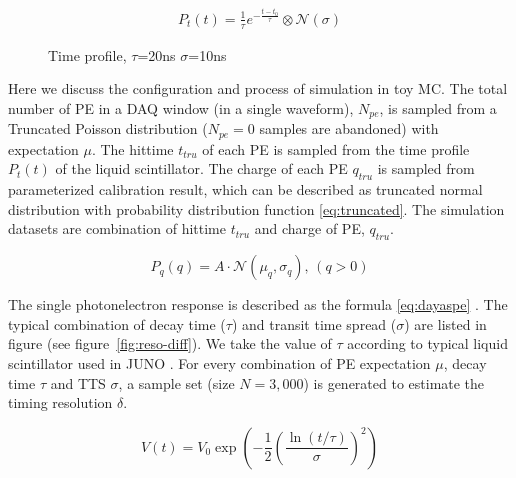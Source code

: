 \begin{minipage}{.4\textwidth}
\begin{align}
    P_{t}(t) = \frac{1}{\tau}e^{-\frac{t - t_{0}}{\tau}} \otimes \mathcal{N}(\sigma)
    \label{eq:time-pro}
\end{align}
\end{minipage}
\begin{minipage}{.6\textwidth}
\begin{figure}[H]
    \centering
    \resizebox{\textwidth}{!}{}
    \caption{\label{fig:time-pro} Time profile, $\tau$=20ns $\sigma$=10ns}
\end{figure}
\end{minipage}

Here we discuss the configuration and process of simulation in toy MC. The total number of PE in a DAQ window (in a single waveform), $N_{pe}$, is sampled from a Truncated Poisson distribution ($N_{pe}=0$ samples are abandoned) with expectation $\mu$. The hittime $t_{tru}$ of each PE is sampled from the time profile $P_{t}(t)$ of the liquid scintillator. The charge of each PE $q_{tru}$ is sampled from parameterized calibration result, which can be described as truncated normal distribution with probability distribution function \eqref{eq:truncated}. The simulation datasets are combination of hittime $t_{tru}$ and charge of PE, $q_{tru}$. 

\begin{equation}
    P_{q}(q) = A\cdot\mathcal{N}(\mu_{q},\sigma_{q}),\,(q>0)
    \label{eq:truncated}
\end{equation}

The single photonelectron response is described as the formula \eqref{eq:dayaspe} \cite{jetter_pmt_2012}. The typical combination of decay time ($\tau$) and transit time spread ($\sigma$) are listed in figure (see figure~\ref{fig:reso-diff}). We take the value of $\tau$ according to typical liquid scintillator used in JUNO \cite{ludhova_particle_2020}. For every combination of PE expectation $\mu$, decay time $\tau$ and TTS $\sigma$, a sample set (size $N=3,000$) is generated to estimate the timing resolution $\delta$. 

\begin{equation}
    V(t) = V_{0}\exp\left(-\frac{1}{2}\left(\frac{\ln(t/\tau)}{\sigma}\right)^{2}\right)
    \label{eq:dayaspe}
\end{equation}

